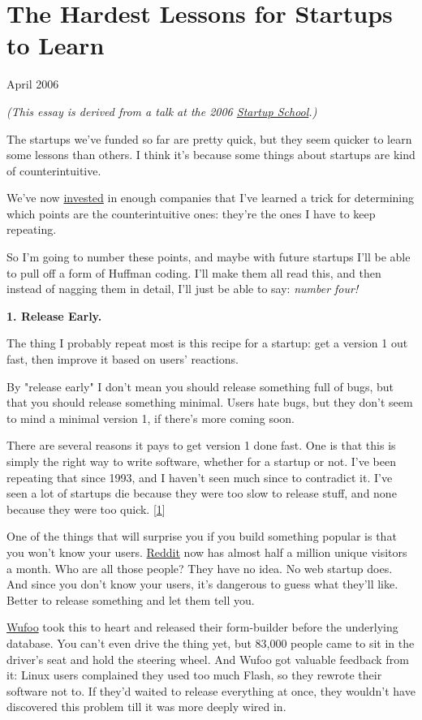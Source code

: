 \chapter{The Hardest Lessons for Startups to Learn}



April 2006

\emph{(This essay is derived from a talk at the 2006 
\href{http://startupschool.org}{Startup School}.)}

The startups we've funded so far are pretty quick, but they seem
quicker to learn some lessons than others.  I think it's because
some things about startups are kind of counterintuitive.

We've now 
\href{http://ycombinator.com}{invested} 
in enough companies that I've learned a trick
for determining which points are the counterintuitive ones:
they're the ones I have to keep repeating.

So I'm going to number these points, and maybe with future startups
I'll be able to pull off a form of Huffman coding. I'll make them
all read this, and then instead of nagging them in detail, I'll
just be able to say: \emph{number four!}


\textbf{1. Release Early.}

The thing I probably repeat most is this recipe for a startup: get
a version 1 out fast, then improve it based on users' reactions.

By "release early" I don't mean you should release something full
of bugs, but that you should release something minimal.  Users hate
bugs, but they don't seem to mind a minimal version 1, if there's
more coming soon.

There are several reasons it pays to get version 1 done fast.  One
is that this is simply the right way to write software, whether for
a startup or not.  I've been repeating that since 1993, and I haven't seen much since to
contradict it.  I've seen a lot of startups die because they were
too slow to release stuff, and none because they were too quick.
[\href{\#f1n}{1}]

One of the things that will surprise you if you build something
popular is that you won't know your users.  \href{http://reddit.com}{Reddit} now has almost half a million
unique visitors a month.  Who are all those people?  They have no
idea.  No web startup does.  And since you don't know your users,
it's dangerous to guess what they'll like.  Better to release
something and let them tell you.

\href{http://wufoo.com}{Wufoo} took this to heart and released
their form-builder before the underlying database.  You can't even
drive the thing yet, but 83,000 people came to sit in the driver's
seat and hold the steering wheel.  And Wufoo got valuable feedback
from it: Linux users complained they used too much Flash, so they
rewrote their software not to.  If they'd waited to release everything
at once, they wouldn't have discovered this problem till it was
more deeply wired in.

